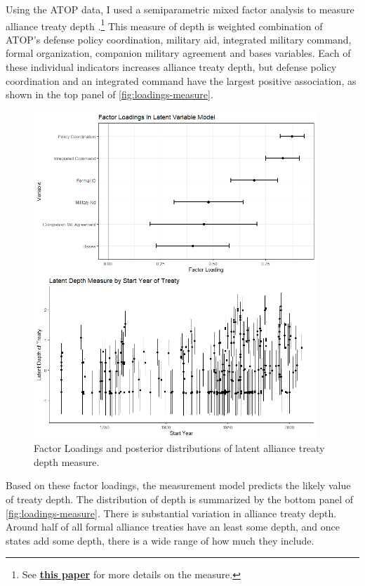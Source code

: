 \documentclass[12pt]{article}
\begin{document}
Using the ATOP data, I used a semiparametric mixed factor analysis to measure alliance treaty depth \citep{Murrayetal2013}.\footnote{See \textbf{\href{https://github.com/joshuaalley/arms-allies/blob/master/manuscript/arms-allies-paper.pdf}{this paper}} for more details on the measure.}
This measure of depth is weighted combination of ATOP's defense policy coordination, military aid, integrated military command, formal organization, companion military agreement and bases variables. 
Each of these individual indicators increases alliance treaty depth, but defense policy coordination and an integrated command have the largest positive association, as shown in the top panel of \autoref{fig:loadings-measure}. 


\begin{figure}[hbtp]
\centering
\includegraphics[width=0.95\textwidth]{../figures/loadings-measure.png}
\caption{Factor Loadings and posterior distributions of latent alliance treaty depth measure.}
\label{fig:loadings-measure}
\end{figure}


Based on these factor loadings, the measurement model predicts the likely value of treaty depth. 
The distribution of depth is summarized by the bottom panel of \autoref{fig:loadings-measure}. 
There is substantial variation in alliance treaty depth. 
Around half of all formal alliance treaties have an least some depth, and once states add some depth, there is a wide range of how much they include.
\end{document}
